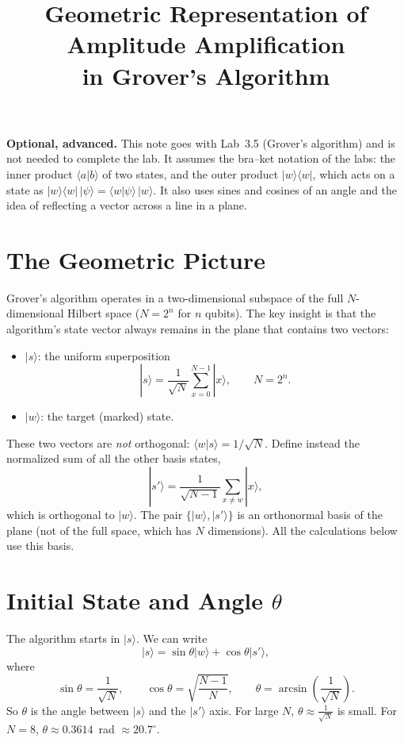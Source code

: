 \documentclass[a4paper,11pt]{article}
\title{Geometric Representation of Amplitude Amplification\\in Grover's Algorithm}
\author{}
\date{}
\providecommand{\ket}[1]{|{#1}\rangle}
\providecommand{\bra}[1]{\langle{#1}|}
\providecommand{\braket}[2]{\langle{#1}|{#2}\rangle}
\begin{document}
\maketitle

\noindent\textbf{Optional, advanced.} This note goes with Lab~3.5 (Grover's algorithm) and is not needed to complete the lab.
It assumes the bra--ket notation of the labs: the inner product $\braket{a}{b}$ of two states, and the outer product
$\ket{w}\bra{w}$, which acts on a state as $\ket{w}\bra{w}\,\ket{\psi} = \braket{w}{\psi}\,\ket{w}$.
It also uses sines and cosines of an angle and the idea of reflecting a vector across a line in a plane.

\section*{The Geometric Picture}

Grover's algorithm operates in a two-dimensional subspace of the full $N$-dimensional Hilbert space ($N=2^n$ for $n$ qubits). The key insight is that the algorithm's state vector always remains in the plane that contains two vectors:

\begin{itemize}
  \item $\ket{s}$: the uniform superposition
    \[
    \ket{s} = \frac{1}{\sqrt{N}}\sum_{x=0}^{N-1}\ket{x},\qquad N=2^n.
    \]
  \item $\ket{w}$: the target (marked) state.
\end{itemize}

These two vectors are \emph{not} orthogonal: $\braket{w}{s} = 1/\sqrt{N}$.
Define instead the normalized sum of all the other basis states,
\[
\ket{s'} = \frac{1}{\sqrt{N-1}}\sum_{x\neq w}\ket{x},
\]
which is orthogonal to $\ket{w}$. The pair $\{\ket{w},\ket{s'}\}$ is an orthonormal basis of the plane (not of the full space, which has $N$ dimensions). All the calculations below use this basis.

\section*{Initial State and Angle $\theta$}

The algorithm starts in $\ket{s}$. We can write
\[
\ket{s} = \sin\theta\ket{w} + \cos\theta\ket{s'},
\]
where
\[
\sin\theta = \frac{1}{\sqrt{N}},\qquad
\cos\theta = \sqrt{\frac{N-1}{N}},\qquad
\theta = \arcsin\left(\frac{1}{\sqrt{N}}\right).
\]
So $\theta$ is the angle between $\ket{s}$ and the $\ket{s'}$ axis.
For large $N$, $\theta\approx\frac{1}{\sqrt{N}}$ is small. For $N=8$, $\theta\approx 0.3614$~rad $\approx 20.7^\circ$.
\end{document}
